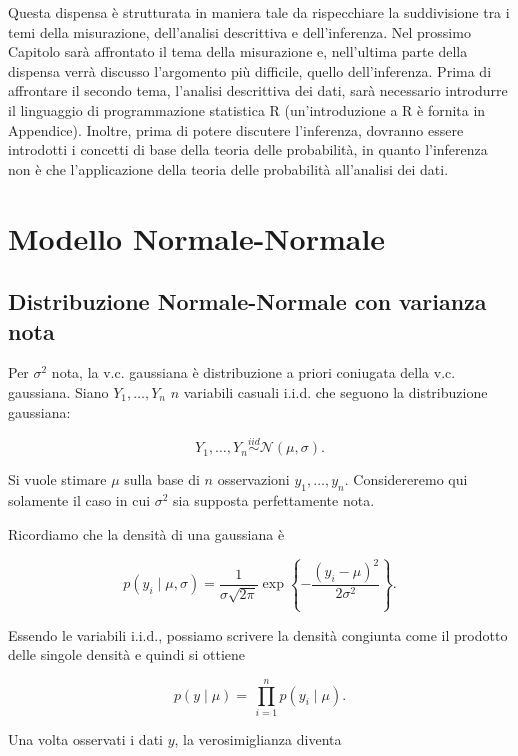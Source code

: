 \documentclass[
  11pt,
]{krantz}
\theoremstyle{definition}
\theoremstyle{definition}
\theoremstyle{definition}
\theoremstyle{definition}
\theoremstyle{remark}
\begin{document}
Questa dispensa è strutturata in maniera tale da rispecchiare la suddivisione tra i temi della misurazione, dell'analisi descrittiva e dell'inferenza. Nel prossimo Capitolo sarà affrontato il tema della misurazione e, nell'ultima parte della dispensa verrà discusso l'argomento più difficile, quello dell'inferenza. Prima di affrontare il secondo tema, l'analisi descrittiva dei dati, sarà necessario introdurre il linguaggio di programmazione statistica R (un'introduzione a R è fornita in Appendice). Inoltre, prima di potere discutere l'inferenza, dovranno essere introdotti i concetti di base della teoria delle probabilità, in quanto l'inferenza non è che l'applicazione della teoria delle probabilità all'analisi dei dati.

\hypertarget{normal-normal-mod-stan}{%
\chapter{Modello Normale-Normale}\label{normal-normal-mod-stan}}

\hypertarget{distribuzione-normale-normale-con-varianza-nota}{%
\section{Distribuzione Normale-Normale con varianza nota}\label{distribuzione-normale-normale-con-varianza-nota}}

Per \(\sigma^2\) nota, la v.c. gaussiana è distribuzione a priori coniugata della v.c. gaussiana. Siano \(Y_1, \dots, Y_n\) \(n\) variabili casuali i.i.d. che seguono la distribuzione gaussiana:

\[
Y_1, \dots, Y_n  \stackrel{iid}{\sim} \mathcal{N}(\mu, \sigma).
\]

Si vuole stimare \(\mu\) sulla base di \(n\) osservazioni \(y_1, \dots, y_n\). Considereremo qui solamente il caso in cui \(\sigma^2\) sia supposta perfettamente nota.

Ricordiamo che la densità di una gaussiana è

\[
p(y_i \mid \mu, \sigma) = \frac{1}{{\sigma \sqrt {2\pi}}}\exp\left\{{-\frac{(y_i - \mu)^2}{2\sigma^2}}\right\}.
\]

Essendo le variabili i.i.d., possiamo scrivere la densità congiunta come il prodotto delle singole densità e quindi si ottiene

\[
p(y \mid \mu) = \, \prod_{i=1}^n p(y_i \mid \mu).
\]

Una volta osservati i dati \(y\), la verosimiglianza diventa
\end{document}
